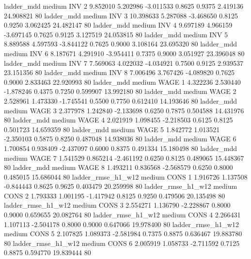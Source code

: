             ladder_mdd     medium      INV                 2  9.852010 5.202986 -3.011533 0.8625 0.9375  2.419136   24.908821 80
            ladder_mdd     medium      INV                 3 10.398633 5.287088 -3.468650 0.8125 0.9250  3.062425   24.482147 80
            ladder_mdd     medium      INV                 4  9.697189 4.966159 -3.697145 0.7625 0.9125  3.127519   24.053815 80
            ladder_mdd     medium      INV                 5  8.889588 4.597593 -3.844122 0.7625 0.9000  3.108164   23.695320 80
            ladder_mdd     medium      INV                 6  8.187671 4.291910 -3.954411 0.7375 0.9000  3.051927   23.396048 80
            ladder_mdd     medium      INV                 7  7.569063 4.022032 -4.034921 0.7500 0.9125  2.939537   23.151356 80
            ladder_mdd     medium      INV                 8  7.006496 3.767426 -4.089820 0.7625 0.9000  2.833463   22.920993 80
            ladder_mdd     medium     WAGE                 1  4.322236 2.530440 -1.878246 0.4375 0.7250  0.599907   13.992180 80
            ladder_mdd     medium     WAGE                 2  2.528961 1.473330 -1.745541 0.5500 0.7750  0.612410   14.193646 80
            ladder_mdd     medium     WAGE                 3  2.377978 1.242840 -2.133698 0.6250 0.7875  0.504588   14.431976 80
            ladder_mdd     medium     WAGE                 4  2.021919 1.098455 -2.218503 0.6125 0.8125  0.501723   14.659359 80
            ladder_mdd     medium     WAGE                 5  1.842772 1.013521 -2.350103 0.5875 0.8250  0.487048   14.938036 80
            ladder_mdd     medium     WAGE                 6  1.700854 0.938409 -2.437097 0.6000 0.8375  0.491334   15.180498 80
            ladder_mdd     medium     WAGE                 7  1.541529 0.865214 -2.461192 0.6250 0.8125  0.489065   15.448367 80
            ladder_mdd     medium     WAGE                 8  1.493211 0.836568 -2.568579 0.6250 0.8000  0.485015   15.686044 80
    ladder_rmse_h1_w12     medium     CONS                 1  1.916726 1.137508 -0.844443 0.8625 0.9625  0.403479   20.259998 80
    ladder_rmse_h1_w12     medium     CONS                 2  1.793333 1.001195 -1.417942 0.8125 0.9250  0.479506   20.135498 80
    ladder_rmse_h1_w12     medium     CONS                 3  2.554271 1.136790 -2.228867 0.8000 0.9000  0.659655   20.082764 80
    ladder_rmse_h1_w12     medium     CONS                 4  2.266431 1.107113 -2.504178 0.8000 0.9000  0.647066   19.978400 80
    ladder_rmse_h1_w12     medium     CONS                 5  2.107825 1.089373 -2.581984 0.7375 0.8875  0.636467   19.883780 80
    ladder_rmse_h1_w12     medium     CONS                 6  2.005919 1.058733 -2.711592 0.7125 0.8875  0.594770   19.839444 80
